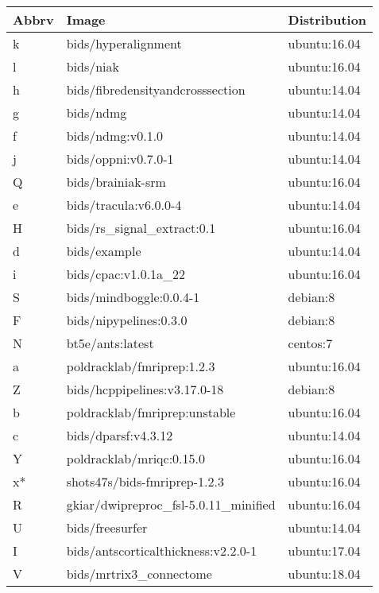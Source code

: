 \addtocounter{table}{-1}
\begin{center}
\tabulinesep=1.2mm
	\begin{longtable} {| p{} | p{} | p{} |}
 \hline
\textbf{Abbrv} &  \textbf{Image} &     \textbf{Distribution} \\
\hline
	k   &  bids/hyperalignment  &  ubuntu:16.04 \\	
\hline
	l   &  bids/niak  &  ubuntu:16.04	\\
\hline
	h   &  bids/fibredensityandcrosssection  &  ubuntu:14.04  \\	
\hline
	g   &  bids/ndmg  &  ubuntu:14.04	\\
\hline
	f   &  bids/ndmg:v0.1.0  &  ubuntu:14.04  \\	
\hline
	j   &  bids/oppni:v0.7.0-1  &  ubuntu:14.04  \\	
\hline
	Q   &  bids/brainiak-srm  &  ubuntu:16.04    \\	
\hline
	e   &  bids/tracula:v6.0.0-4  &  ubuntu:14.04   \\	
\hline
	H   &  bids/rs\_signal\_extract:0.1  &  ubuntu:16.04   \\	
\hline
	d   &  bids/example  &  ubuntu:14.04	\\
\hline
	i   &  bids/cpac:v1.0.1a\_22  &  ubuntu:16.04 \\	
\hline
	S   &  bids/mindboggle:0.0.4-1  &  debian:8	\\
\hline
	F   &  bids/nipypelines:0.3.0  &  debian:8	\\
\hline
	N   &  bt5e/ants:latest  &  centos:7	\\
\hline
	a   &  poldracklab/fmriprep:1.2.3  &  ubuntu:16.04	\\
\hline
	Z   &  bids/hcppipelines:v3.17.0-18  &  debian:8	\\
\hline
	b   &  poldracklab/fmriprep:unstable  &  ubuntu:16.04	\\
\hline
	c   &  bids/dparsf:v4.3.12  &  ubuntu:14.04	\\
\hline
	Y   &  poldracklab/mriqc:0.15.0  &  ubuntu:16.04  \\	
\hline
	x*   &  shots47s/bids-fmriprep-1.2.3  &  ubuntu:16.04 \\	
\hline
	R   &  gkiar/dwipreproc\_fsl-5.0.11\_minified  &  ubuntu:16.04 \\	
\hline
	U   &  bids/freesurfer  &  ubuntu:14.04	\\
\hline
	I   &  bids/antscorticalthickness:v2.2.0-1  &  ubuntu:17.04	\\
\hline
	V   &  bids/mrtrix3\_connectome  &  ubuntu:18.04	\\

\end{longtable}
\end{center}
